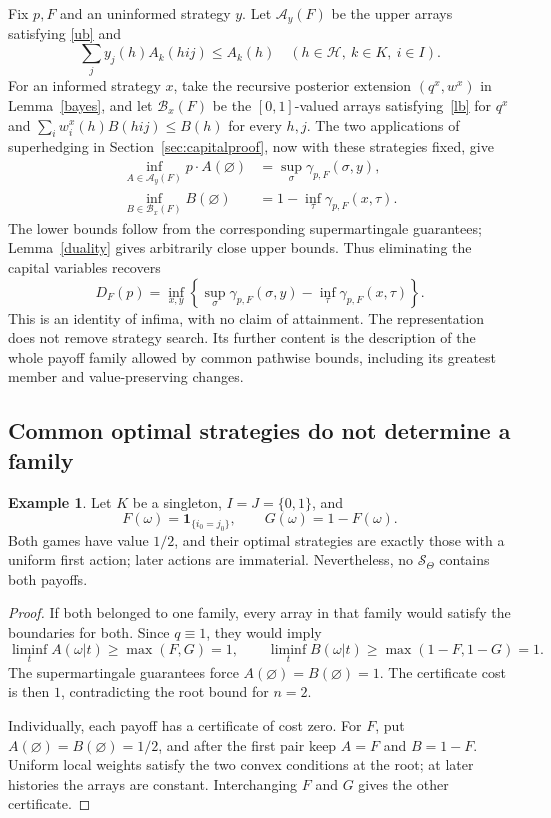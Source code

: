 \documentclass[11pt,a4paper]{article}
\theoremstyle{definition}
\newtheorem{example}[theorem]{Example}
\theoremstyle{remark}
\newcommand{\HH}{\mathcal H}
\newcommand{\ind}{\mathbf 1}
\begin{document}
Fix $p,F$ and an uninformed strategy $y$. Let $\mathcal A_y(F)$ be
the upper arrays satisfying \eqref{ub} and
\[
 \sum_jy_j(h)A_k(hij)\leq A_k(h)\quad(h\in\HH,\ k\in K,\ i\in I).
\]
For an informed strategy $x$, take the recursive posterior extension
$(q^x,w^x)$ in Lemma~\ref{bayes}, and let $\mathcal B_x(F)$ be
the $[0,1]$-valued arrays satisfying~\eqref{lb} for $q^x$ and
$\sum_iw_i^x(h)B(hij)\leq B(h)$ for every $h,j$.
The two applications of superhedging in Section~\ref{sec:capitalproof},
now with these strategies fixed, give
\begin{align}
 \inf_{A\in\mathcal A_y(F)}p\cdot A(\varnothing)
       &=\sup_\sigma\gamma_{p,F}(\sigma,y),\label{eq:fixedupper}\\
 \inf_{B\in\mathcal B_x(F)}B(\varnothing)
       &=1-\inf_\tau\gamma_{p,F}(x,\tau).\label{eq:fixedlower}
\end{align}
The lower bounds follow from the corresponding supermartingale
guarantees; Lemma~\ref{duality} gives arbitrarily close upper
bounds. Thus eliminating the capital variables recovers
\[
 D_F(p)=\inf_{x,y}\left\{
       \sup_\sigma\gamma_{p,F}(\sigma,y)
       -\inf_\tau\gamma_{p,F}(x,\tau)\right\}.
\]
This is an identity of infima, with no claim of attainment. The
representation does not remove strategy search. Its further content
is the description of the whole payoff family allowed by common
pathwise bounds, including its greatest member and value-preserving
changes.

\subsection{Common optimal strategies do not determine a family}

\begin{example}\label{ex:matching}
Let $K$ be a singleton, $I=J=\{0,1\}$, and
\[
 F(\omega)=\ind_{\{i_0=j_0\}},\qquad G(\omega)=1-F(\omega).
\]
Both games have value $1/2$, and their optimal strategies are exactly
those with a uniform first action; later actions are immaterial.
Nevertheless, no $\mathcal S_\Theta$ contains both payoffs.
\end{example}

\begin{proof}
If both belonged to one family, every array in that family would
satisfy the boundaries for both. Since $q\equiv1$, they would imply
\[
 \liminf_tA(\omega|t)\geq\max(F,G)=1,\qquad
 \liminf_tB(\omega|t)\geq\max(1-F,1-G)=1.
\]
The supermartingale guarantees force $A(\varnothing)=B(\varnothing)=1$.
The certificate cost is then $1$, contradicting the root bound for
$n=2$.

Individually, each payoff has a certificate of cost zero. For $F$,
put $A(\varnothing)=B(\varnothing)=1/2$, and after the first pair
keep $A=F$ and $B=1-F$. Uniform local weights satisfy the two convex
conditions at the root; at later histories the arrays are constant.
Interchanging $F$ and $G$ gives the other certificate.
\end{proof}
\end{document}
